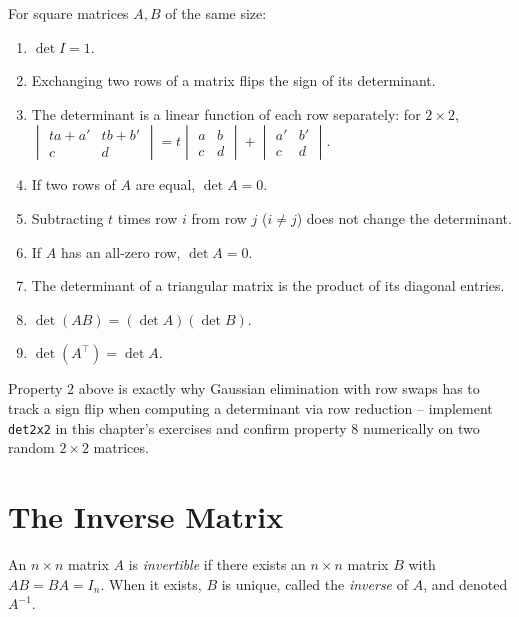 \documentclass[11pt]{article}
\begin{document}
\begin{theorem}
For square matrices $A, B$ of the same size:
\begin{enumerate}
  \item $\det I = 1$.
  \item Exchanging two rows of a matrix flips the sign of its determinant.
  \item The determinant is a linear function of each row separately: for
        $2\times 2$, $\begin{vmatrix} ta+a' & tb+b' \\ c & d\end{vmatrix}
        = t\begin{vmatrix}a&b\\c&d\end{vmatrix} +
        \begin{vmatrix}a'&b'\\c&d\end{vmatrix}$.
  \item If two rows of $A$ are equal, $\det A = 0$.
  \item Subtracting $t$ times row $i$ from row $j$ ($i \ne j$) does not
        change the determinant.
  \item If $A$ has an all-zero row, $\det A = 0$.
  \item The determinant of a triangular matrix is the product of its
        diagonal entries.
  \item $\det(AB) = (\det A)(\det B)$.
  \item $\det(A^\top) = \det A$.
\end{enumerate}
\end{theorem}

\begin{tryit}
Property 2 above is exactly why Gaussian elimination with row swaps has
to track a sign flip when computing a determinant via row reduction --
implement \texttt{det2x2} in this chapter's exercises and confirm
property 8 numerically on two random $2\times 2$ matrices.
\end{tryit}

\section{The Inverse Matrix}

\begin{definition}
An $n\times n$ matrix $A$ is \emph{invertible} if there exists an $n
\times n$ matrix $B$ with $AB = BA = I_n$. When it exists, $B$ is unique,
called the \emph{inverse} of $A$, and denoted $A^{-1}$.
\end{definition}
\end{document}
